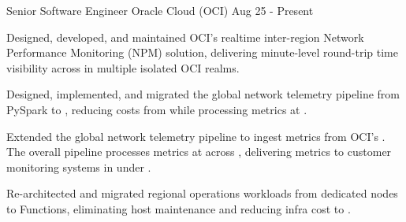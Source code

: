 \begin{cventries}
  \cventry
    {Senior Software Engineer}
    {Oracle Cloud (OCI)}
    {Aug 25 - Present}
    {}
    {
      \begin{cvitems}
        \item {Designed, developed, and maintained OCI’s  realtime inter-region Network Performance Monitoring (NPM) solution, delivering minute-level round-trip time visibility across  in multiple isolated OCI realms.}
        \item {Designed, implemented, and migrated the global network telemetry pipeline from PySpark to , reducing costs from  while processing metrics at .}
        \item {Extended the global network telemetry pipeline to ingest metrics from OCI's . The overall pipeline processes metrics at  across , delivering metrics to customer monitoring systems in under .}
        \item {Re-architected and migrated regional operations workloads from dedicated nodes to  Functions, eliminating host maintenance and reducing infra cost to .}
      \end{cvitems}
    }
  

\end{cventries}
